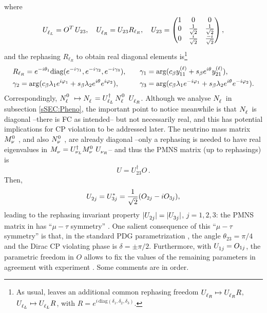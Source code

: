 \documentclass[12pt,a4paper]{article}
\begin{document}
where
\begin{equation}\label{eq:LepDiag:00}
 \ULL=O^T\,U_{23},\quad \URL=U_{23}R_{\ell_R},\quad 
 U_{23}=\begin{pmatrix}1&0&0\\ 0&\frac{1}{\sqrt 2}& \frac{1}{\sqrt 2}\\ 0&\frac{i}{\sqrt 2}& \frac{-i}{\sqrt 2}\end{pmatrix},
\end{equation}
and the rephasing $R_{\ell_R}$ to obtain real diagonal elements is\footnote{As usual,  leaves an additional common rephasing freedom $\URL\mapsto\URL R$, $\ULL\mapsto\ULL R$, with $R=e^{i\,\text{diag}(\delta_1,\delta_2,\delta_3)}$.}
\begin{equation}
\begin{aligned}
 &R_{\ell_R}=e^{-i\vevPh{1}}\text{diag}(e^{-i\gamma_1},e^{-i\gamma_2},e^{-i\gamma_3}),\quad && \gamma_1=\arg(\Cb\yL{11}+\Sb e^{i\vevPh{}}\yL{21}),\\ &\gamma_2=\arg(\Cb\lambda_{1}e^{i\varphi_1}+\Sb\lambda_2 e^{i\vevPh{}}e^{i\varphi_2}),\ &&\gamma_3=\arg(\Cb\lambda_{1}e^{-i\varphi_1}+\Sb\lambda_2 e^{i\vevPh{}}e^{-i\varphi_2}).
 \end{aligned}
\end{equation}
Correspondingly, $\wNL\mapsto\mNL=\ULLd\,\wNL\,\URL$. Although we analyse $\mNL$ in subsection \ref{sSEC:Pheno}, the important point to notice meanwhile is that $\mNL$ is diagonal --there is FC as intended-- but not necessarily real, and this has potential implications for CP violation to be addressed later. The neutrino mass matrix $\wMN$, and also $\wNN$, are already diagonal --only a rephasing is needed to have real eigenvalues in $\mMN=\ULNd\wMN\URN$-- and thus the PMNS matrix (up to rephasings) is
\begin{equation}\label{eq:PMNS:00}
 U=U_{23}^\dagger O\,.
\end{equation}
Then,
\begin{equation}\label{eq:PMNS:01}
 \U{2j}=\Uc{3j}=\frac{1}{\sqrt 2}(O_{2j}-iO_{3j}),
\end{equation}
leading to the rephasing invariant property $|\U{2j}|=|\U{3j}|$, $j=1,2,3$: the PMNS matrix in  has ``$\mu-\tau$ symmetry'' \cite{Harrison:2002et}. One salient consequence of this ``$\mu-\tau$ symmetry'' is that, in the standard PDG parametrization \cite{Chau:1984fp,ParticleDataGroup:2022pth}, the angle $\theta_{23}=\pi/4$ and the Dirac CP violating phase is $\delta=\pm\pi/2$. Furthermore, with $\U{1j}=O_{1j}$, the parametric freedom in $O$ allows to fix the values of the remaining parameters  in agreement with experiment \cite{Gonzalez-Garcia:2021dve,deSalas:2020pgw}. Some comments are in order.
\end{document}
